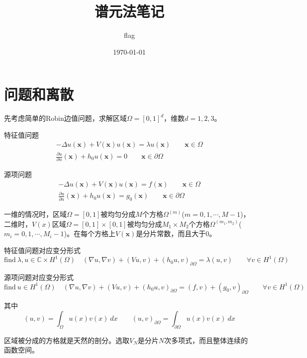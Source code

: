\documentclass[UTF8,12pt]{article}
\title{谱元法笔记}
\author{flag}
\date{\today}
\begin{document}
\maketitle

\section{问题和离散}

先考虑简单的Robin边值问题，求解区域$\Omega = [0,1]^d$，维数$d = 1, 2, 3$。

特征值问题
\begin{eqnarray}
- \Delta u(\mathbf{x}) + V(\mathbf{x}) u(\mathbf{x}) = \lambda u(\mathbf{x}) \qquad \mathbf{x} \in \Omega \\
\frac{\partial u}{\partial n}(\mathbf{x}) + h_0 u(\mathbf{x}) = 0 \qquad \mathbf{x} \in \partial \Omega
\end{eqnarray}

源项问题
\begin{eqnarray}
- \Delta u(\mathbf{x}) + V(\mathbf{x}) u(\mathbf{x}) = f(\mathbf{x}) \qquad \mathbf{x} \in \Omega \\
\frac{\partial u}{\partial n}(\mathbf{x}) + h_0 u(\mathbf{x}) = g_0(\mathbf{x}) \qquad \mathbf{x} \in \partial \Omega
\end{eqnarray}

一维的情况时，区域$\Omega=[0,1]$被均匀分成$M$个方格$\Omega^{(m)}$($m = 0, 1, \cdots, M-1$)，二维时，$V(x)$区域$\Omega=[0,1] \times [0,1]$被均匀分成$M_1 \times M_2$个方格$\Omega^{(m_1, m_2)}$($m_i = 0, 1, \cdots, M_i-1$)。在每个方格上$V(\mathbf{x})$是分片常数，而且大于0。

特征值问题对应变分形式
\begin{equation}
\text{find} \ \lambda, u \in \mathbb{C} \times H^1(\Omega) \quad (\nabla u, \nabla v) + (V u, v) + (h_0 u, v)_{\partial\Omega} = \lambda (u, v) \qquad \forall v \in  H^1(\Omega)
\end{equation}

源项问题对应变分形式
\begin{equation}
\text{find} \ u \in H^1(\Omega) \quad (\nabla u, \nabla v) + (V u, v) + (h_0 u, v)_{\partial\Omega} = (f, v) + (g_0, v)_{\partial\Omega} \qquad \forall v \in  H^1(\Omega)
\end{equation}

其中
$$ (u, v) = \int_\Omega u(x) v(x) \ dx \qquad (u, v)_{\partial\Omega} = \int_{\partial\Omega} u(x) v(x) \ dx $$

区域被分成的方格就是天然的剖分。选取$V_N$是分片$N$次多项式，而且整体连续的函数空间。
\end{document}
